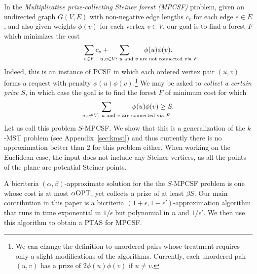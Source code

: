 \documentclass[extras,11pt]{article} \usepackage{fullpage}
\theoremstyle{mytheorem}
\newcommand{\eps}{\epsilon}
\newcommand{\prob}[1]{\textit{#1}}
\newcommand{\OPT}{\mbox{\rm OPT}}
\begin{document}
In the \prob{Multiplicative prize-collecting Steiner forest
(MPCSF)} problem, given an undirected graph $G(V,E)$ with
non-negative edge lengths $c_e$ for each edge $e\in E$, and also
given weights $\phi(v)$ for each vertex $v\in V$, our goal is to
find a forest $F$ which minimizes the cost
\[   \sum_{e\in F} c_e  +  \hskip-.5cm\sum_{{u,v\in V}:{\text{ $u$ and $v$ are not connected via $F$\hskip-2.5cm}}} \hskip-.3cm\phi(u)\phi(v).  \]
Indeed, this is an instance of PCSF in which each ordered vertex pair
$(u,v)$ forms a request with penalty $\phi(u)\phi(v)$.\footnote{We can change the definition to unordered pairs whose treatment requires only a slight modifications of the algorithms.  Currently, each unordered pair $(u,v)$ has a prize of $2\phi(u)\phi(v)$ if $u\neq v$.}
 We may be asked
to \emph{collect a certain prize $S$}, in which case the goal is to
find the forest $F$ of minimum cost for which
\[ \sum_{{u,v\in V}:{\text{ $u$ and $v$ are connected via $F$\hskip-2cm}}} \phi(u)\phi(v) \geq S. \]
Let us call this problem $S$-MPCSF. We show that this is a
generalization of the $k$-MST problem (see Appendix~\ref{sec:kmst}) and thus currently there is no approximation better than 2
for this problem either. When working on the Euclidean case, the
input does not include any Steiner vertices, as all the points of
the plane are potential Steiner points.

A bicriteria $(\alpha,\beta)$-approximate solution for the the
$S$-MPCSF problem is one whose cost is at most $\alpha\OPT$, yet
collects a prize of at least $\beta S$. Our main contribution in
this paper is a bicriteria $(1+\eps,1-\eps')$-approximation
algorithm that runs in time exponential in $1/\eps$ but polynomial
in $n$ and $1/\eps'$. We then use this  algorithm to obtain a PTAS for
MPCSF.
\end{document}
